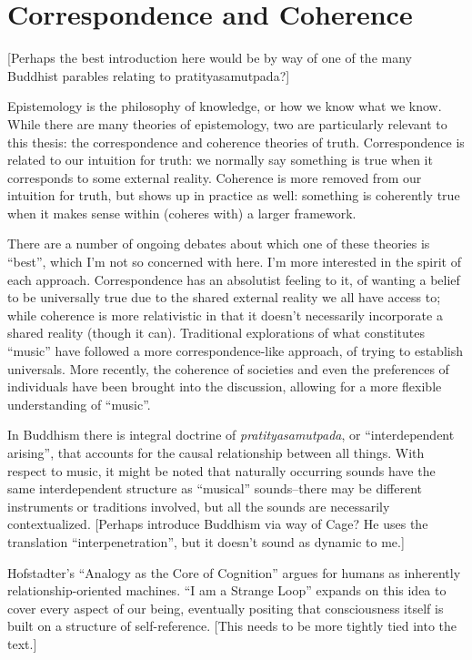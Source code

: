 \documentclass{thesis}
\begin{document}
\section{Correspondence and Coherence}
	[Perhaps the best introduction here would be by way of one of the many Buddhist parables relating to pratityasamutpada?]

	Epistemology is the philosophy of knowledge, or how we know what we know.\cite{Blackburn07} While there are many theories of epistemology, two are particularly relevant to this thesis: the correspondence\cite{david_correspondence_????} and coherence\cite{young_coherence_????} theories of truth. Correspondence is related to our intuition for truth: we normally say something is true when it corresponds to some external reality. Coherence is more removed from our intuition for truth, but shows up in practice as well: something is coherently true when it makes sense within (coheres with) a larger framework.
	
	There are a number of ongoing debates about which one of these theories is ``best'', which I'm not so concerned with here. I'm more interested in the spirit of each approach. Correspondence has an absolutist feeling to it, of wanting a belief to be universally true due to the shared external reality we all have access to; while coherence is more relativistic in that it doesn't necessarily incorporate a shared reality (though it can). Traditional explorations of what constitutes ``music'' have followed a more correspondence-like approach, of trying to establish universals. More recently, the coherence of societies and even the preferences of individuals have been brought into the discussion, allowing for a more flexible understanding of ``music''.

	In Buddhism there is integral doctrine of \emph{pratityasamutpada}, or ``interdependent arising'', that accounts for the causal relationship between all things.\cite{Koller01} With respect to music, it might be noted that naturally occurring sounds have the same interdependent structure as ``musical'' sounds--there may be different instruments or traditions involved, but all the sounds are necessarily contextualized. [Perhaps introduce Buddhism via way of Cage? He uses the translation ``interpenetration'', but it doesn't sound as dynamic to me.]

	Hofstadter's ``Analogy as the Core of Cognition''\cite{Hofstadter01} argues for humans as inherently relationship-oriented machines. ``I am a Strange Loop''\cite{Hofstadter07} expands on this idea to cover every aspect of our being, eventually positing that consciousness itself is built on a structure of self-reference. [This needs to be more tightly tied into the text.]
\end{document}
